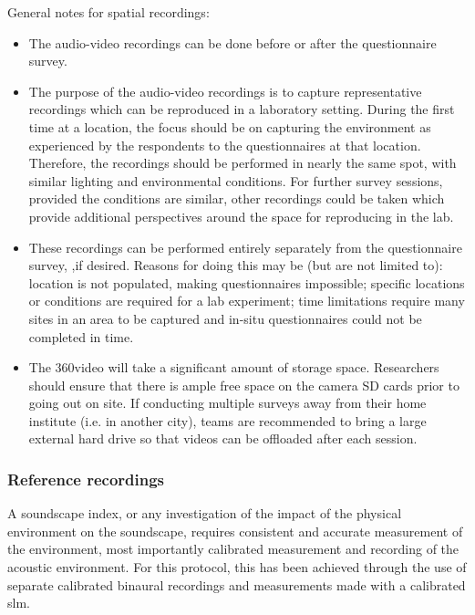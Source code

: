    General notes for spatial recordings:

   \begin{itemize}
     \item The audio-video recordings can be done before or after the questionnaire survey.
     \item The purpose of the audio-video recordings is to capture representative recordings which can be reproduced in a laboratory setting. During the first time at a location, the focus should be on capturing the environment as experienced by the respondents to the questionnaires at that location. Therefore, the recordings should be performed in nearly the same spot, with similar lighting and environmental conditions. For further survey sessions, provided the conditions are similar, other recordings could be taken which provide additional perspectives around the space for reproducing in the lab.
     \item These recordings can be performed entirely separately from the questionnaire survey, ,if desired. Reasons for doing this may be (but are not limited to): location is not populated, making questionnaires impossible; specific locations or conditions are required for a lab experiment; time limitations require many sites in an area to be captured and in-situ questionnaires could not be completed in time.
     \item The 360\degree video will take a significant amount of storage space. Researchers should ensure that there is ample free space on the camera SD cards prior to going out on site. If conducting multiple surveys away from their home institute (i.e. in another city), teams are recommended to bring a large external hard drive so that videos can be offloaded after each session.
   \end{itemize}

   \subsubsection{Reference recordings}

   A soundscape index, or any investigation of the impact of the physical environment on the soundscape, requires consistent and accurate measurement of the environment, most importantly calibrated measurement and recording of the acoustic environment. For this protocol, this has been achieved through the use of separate calibrated binaural recordings and measurements made with a calibrated \gls{slm}.



